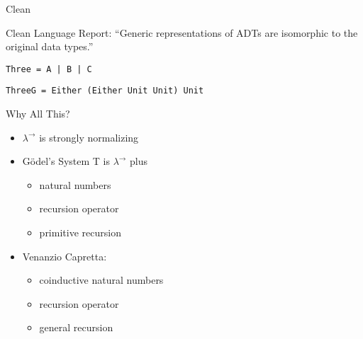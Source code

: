 \documentclass{beamer}
\newcommand{\arr}{\rightarrow}
\begin{document}
\begin{frame}[fragile]{Clean}

Clean Language Report: ``Generic representations of ADTs are isomorphic to the original data types.''

\texttt{Three = A | B | C}


\texttt{ThreeG = Either (Either Unit Unit) Unit}


\end{frame}


\begin{frame}{Why All This?}

\begin{itemize}
\item $\lambda^\arr$ is strongly normalizing
\item Gödel's System T is $\lambda^\arr$ plus
  \begin{itemize}
  \item natural numbers
  \item recursion operator
  \item primitive recursion
  \end{itemize}
\item Venanzio Capretta:
  \begin{itemize}
  \item coinductive natural numbers
  \item recursion operator
  \item general recursion
  \end{itemize}
\end{itemize}

\end{frame}
\end{document}
